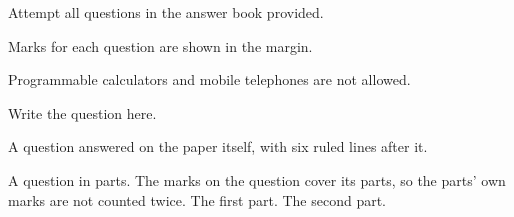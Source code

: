 \documentclass[type=mid]{saus-exam}
\begin{document}
\makeexamhead

\begin{instructions}
  \item Attempt all questions in the answer book provided.
  \item Marks for each question are shown in the margin.
  \item Programmable calculators and mobile telephones are not allowed.
\end{instructions}


\question[marks=5, clo=1, bloom=Understand, topic=Complexity]
Write the question here.

\question[marks=5, clo=2, bloom=Apply, topic=Stacks, lines=6]
A question answered on the paper itself, with six ruled lines after it.


\question[marks=20, clo=3, bloom=Analyse, topic=Sorting]
A question in parts. The marks on the question cover its parts, so the
parts' own marks are not counted twice.
\qpart[marks=12]
The first part.
\qpart[marks=8]
The second part.


\examend

\clearpage
\sausmarkstable
\end{document}
